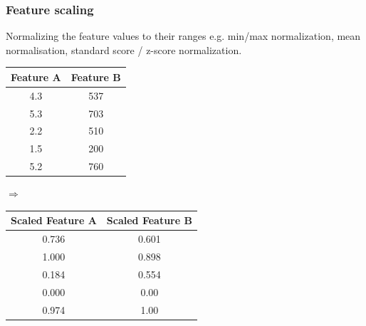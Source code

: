\documentclass[aspectratio=169]{beamer}
\begin{document}
\begin{frame}
  \frametitle{Feature scaling}
  \begin{block}{}

    \begin{center}
      Normalizing the feature values to their ranges e.g. min/max
      normalization, mean normalisation, standard score / z-score
      normalization.
    \end{center}
    
    \vspace{0.5cm}
    \hspace{1cm}
    \begin{minipage}{0.33\textwidth}
      {\small
        \begin{tabular}{|c|c|}
          \hline
          \textbf{Feature A} & \textbf{Feature B}\\
          \hline
          4.3 & 537\\
          5.3 & 703\\
          2.2 & 510\\
          1.5 & 200\\
          5.2 & 760\\
          \hline          
        \end{tabular}
      }
    \end{minipage}
    \begin{minipage}{0.08\textwidth}
      $\Rightarrow$
    \end{minipage}        
    \begin{minipage}{0.40\textwidth}
      {\small
        \begin{tabular}{|c|c|}
          \hline
          \textbf{Scaled Feature A} & \textbf{Scaled Feature B}\\
          \hline
          0.736 & 0.601\\
          1.000 & 0.898\\
          0.184 & 0.554\\
          0.000 & 0.00\\
          0.974 & 1.00\\
          \hline          
        \end{tabular}
      }
    \end{minipage}
    \hspace{1cm}
    \vspace{0.5cm}
  \end{block}
\end{frame}
\end{document}
